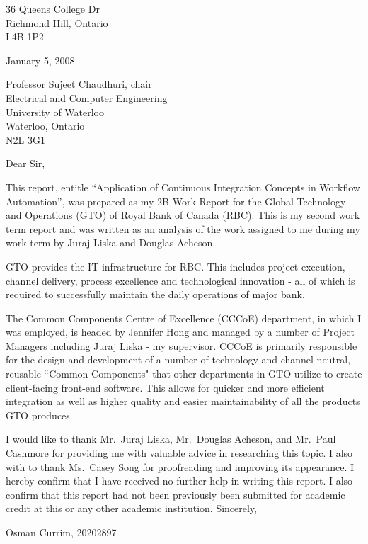 \begin{titlepage} \raggedright
36 Queens College Dr\\
Richmond Hill, Ontario\\
L4B 1P2\newline

January 5, 2008\newline

Professor Sujeet Chaudhuri, chair\\
Electrical and Computer Engineering\\
University of Waterloo\\
Waterloo, Ontario\\
N2L 3G1\newline

Dear Sir,\newline

This report, entitle ``Application of Continuous Integration Concepts in Workflow Automation'', was prepared as my 2B Work Report for the Global Technology and Operations (GTO) of Royal Bank of Canada (RBC). This is my second work term report and was written as an analysis of the work assigned to me during my work term by Juraj Liska and Douglas Acheson.\newline

GTO provides the IT infrastructure for RBC. This includes project execution, channel delivery, process excellence and technological innovation - all of which is required to successfully maintain the daily operations of major bank.\newline

The Common Components Centre of Excellence (CCCoE) department, in which I was employed, is headed by Jennifer Hong and managed by a number of Project Managers including Juraj Liska - my supervisor. CCCoE is primarily responsible for the design and development of a number of technology and channel neutral, reusable ``Common Components" that other departments in GTO utilize to create client-facing front-end software. This allows for quicker and more efficient integration as well as higher quality and easier maintainability of all the products GTO produces.\newline

I would like to thank Mr.\ Juraj Liska, Mr.\ Douglas Acheson, and Mr.\ Paul Cashmore for providing me with valuable advice in researching this topic.  I also with to thank Ms.\ Casey Song for proofreading and improving its appearance. I hereby confirm that I have received no further help in writing this report.  I also confirm that this report had not been previously been submitted for academic credit at this or any other academic institution.\newline
\vfill
Sincerely,\newline

Osman Currim, 20202897
\end{titlepage}